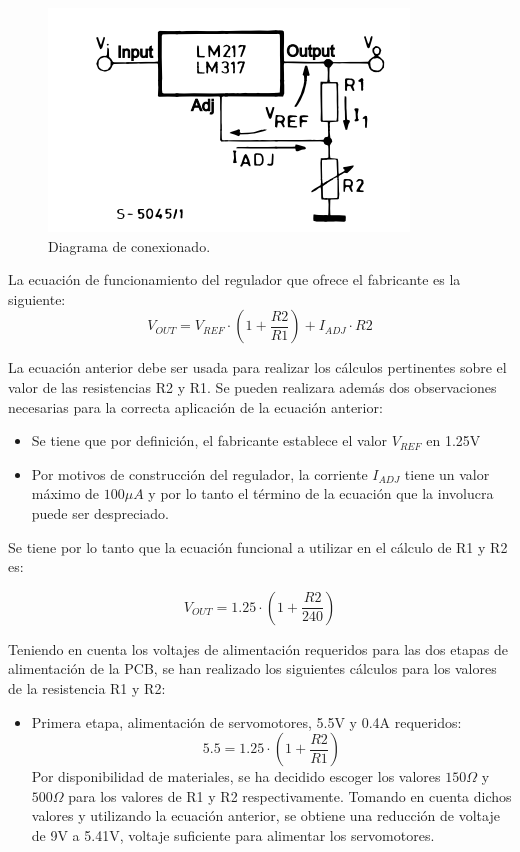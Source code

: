 \begin{figure}[H]
    \centering 
    \includegraphics[width=.6\linewidth]{pictures/Lm317 conexionado.PNG}
    \caption{Diagrama de conexionado.}
    \label{fig:kdiagram}
\end{figure}


La ecuación de funcionamiento del regulador que ofrece el fabricante es la siguiente:
\begin{equation}
    V_{OUT} = V_{REF} \cdot \left( 1 + \frac{R2}{R1}\right) + I_{ADJ} \cdot R2
\end{equation}

La ecuación anterior debe ser usada para realizar los cálculos pertinentes sobre el valor de las resistencias R2 y R1. Se pueden realizara además dos observaciones necesarias para la correcta aplicación de la ecuación anterior:
\begin{itemize}
    \item Se tiene que por definición, el fabricante establece el valor $V_{REF}$ en 1.25V
    \item Por motivos de construcción del regulador, la corriente $I_{ADJ}$ tiene un valor máximo de $100 \mu A$ y por lo tanto el término de la ecuación que la involucra puede ser despreciado.
\end{itemize}

Se tiene por lo tanto que la ecuación funcional a utilizar en el cálculo de R1 y R2 es:

\begin{equation}
    V_{OUT} = 1.25 \cdot \left( 1 + \frac{R2}{240}\right) 
\end{equation}

Teniendo en cuenta los voltajes de alimentación requeridos para las dos etapas de alimentación de la PCB, se han realizado los siguientes cálculos para los valores de la resistencia R1 y R2:
\begin{itemize}
    \item Primera etapa, alimentación de servomotores, 5.5V y 0.4A requeridos:
    \begin{equation}
        5.5 = 1.25 \cdot \left( 1 + \frac{R2}{R1}\right) 
    \end{equation}
    Por disponibilidad de materiales, se ha decidido escoger los valores $150 \Omega$ y $500 \Omega$ para los valores de R1 y R2 respectivamente. Tomando en cuenta dichos valores y utilizando la ecuación anterior, se obtiene una reducción de voltaje de 9V a 5.41V, voltaje suficiente para alimentar los servomotores.
\end{itemize}

